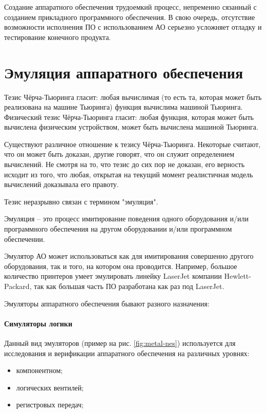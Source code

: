 Создание аппаратного обеспечения трудоемкий процесс, непременно сязанный с созданием прикладного программного обеспечения.
В свою очередь, отсутствие возможности исполнения ПО с использованием АО серьезно усложняет отладку и тестирование конечного продукта.

\section{Эмуляция аппаратного обеспечения}\label{sec:ch1/sec1}

Тезис Чёрча-Тьюринга гласит: любая вычислимая (то есть та,
которая может быть реализована на машине Тьюринга) функция вычислима машиной Тьюринга.
Физический тезис Чёрча-Тьюринга гласит: любая функция, которая может быть вычислена физическим устройством, может быть вычислена машиной Тьюринга.

Существуют различное отношение к тезису Чёрча-Тьюринга.
Некоторые считают, что он может быть доказан, другие говорят, что он служит определением вычислений.
Не смотря на то, что тезис до сих пор не доказан, его верность исходит из того, что любая, открытая на текущий момент
реалистичная модель вычислений доказывала его правоту.

Тезис неразрывно связан с термином "эмуляция".

Эмуляция -- это процесс имитирование поведения одного оборудования и/или программного обеспечения
на другом оборудовании и/или программном обеспечении.

Эмулятор АО может использоваться как для имитирования совершенно другого оборудования, так и того, на котором она проводится.
Например, большое количество принтеров умеет эмулировать линейку LaserJet компании Hewlett-Packard,
так как большая часть ПО разработана как раз под LaserJet.

Эмуляторы аппаратного обеспечения бывают разного назначения:

\paragraph{Симуляторы логики}\label{logic-sim}

Данный вид эмуляторов (пример на рис. \ref{fig:metal-nes})
используется для исследования и верификации аппаратного обеспечения на различных уровнях:
\begin{itemize}
    \item компонентном;
    \item логических вентилей;
    \item регистровых передач;
\end{itemize}



